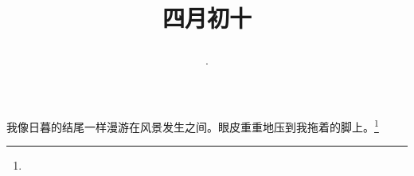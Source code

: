 \title{\date[d=17,m=5,y=2024][year:cn-y,年,month:cn,day:cn,日,·,weekday]·四月初十 }
我像日暮的结尾一样漫游在风景发生之间。眼皮重重地压到我拖着的脚上。\footnote{ }

